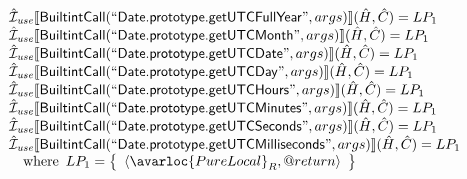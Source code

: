 \[\begin{array}{l}
\aI_{\it use}\lbr \SF{BuiltintCall}(``\SF{Date.prototype.getUTCFullYear}",args)\rbr(\hat{H},\hat{C}) = LP_1\\
\aI_{\it use}\lbr \SF{BuiltintCall}(``\SF{Date.prototype.getUTCMonth}",args)\rbr(\hat{H},\hat{C}) = LP_1\\
\aI_{\it use}\lbr \SF{BuiltintCall}(``\SF{Date.prototype.getUTCDate}",args)\rbr(\hat{H},\hat{C}) = LP_1\\
\aI_{\it use}\lbr \SF{BuiltintCall}(``\SF{Date.prototype.getUTCDay}",args)\rbr(\hat{H},\hat{C}) = LP_1\\
\aI_{\it use}\lbr \SF{BuiltintCall}(``\SF{Date.prototype.getUTCHours}",args)\rbr(\hat{H},\hat{C}) = LP_1\\
\aI_{\it use}\lbr \SF{BuiltintCall}(``\SF{Date.prototype.getUTCMinutes}",args)\rbr(\hat{H},\hat{C}) = LP_1\\
\aI_{\it use}\lbr \SF{BuiltintCall}(``\SF{Date.prototype.getUTCSeconds}",args)\rbr(\hat{H},\hat{C}) = LP_1\\
\aI_{\it use}\lbr \SF{BuiltintCall}(``\SF{Date.prototype.getUTCMilliseconds}",args)\rbr(\hat{H},\hat{C}) = LP_1\\
\quad\wherec{
  LP_1 = \set{\langle\avarloc{PureLocal}_R,\varprop{return}\rangle}\\
  }\\
\\
\end{array}
\]

